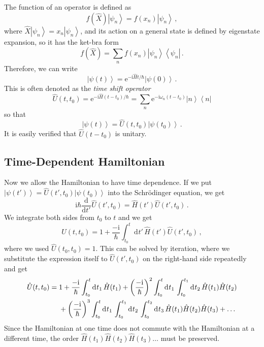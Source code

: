 \documentclass{article}
\theoremstyle{plain}\theoremheaderfont{\normalfont\itshape}\theorembodyfont{\rmfamily}\theoremseparator{.}\newtheorem*{rem}{Remark}\newtheorem*{ex}{Example}\newtheorem*{proof}{Proof}\newtheorem*{altp}{Alternative proof}
\theoremstyle{plain}\theoremheaderfont{\normalfont\bfseries}\theorembodyfont{\rmfamily}\theoremseparator{.}\newtheorem{thm}{Theorem}[section]\newtheorem{lem}[thm]{Lemma}\newtheorem{prop}[thm]{Proposition}\newtheorem*{cor}{Corollary}\newtheorem{defn}[thm]{Definition}\newtheorem{clm}[thm]{Claim}\newtheorem{clminproof}{Claim}
\theoremstyle{break}\theoremheaderfont{\normalfont\itshape}\theorembodyfont{\rmfamily}\theoremseparator{.\medskip}\newtheorem*{proofskip}{Proof}\newtheorem*{exs}{Examples}\newtheorem*{rems}{Remarks}
\theoremstyle{break}\theoremheaderfont{\normalfont\bfseries}\theorembodyfont{\rmfamily}\theoremseparator{.\medskip}\newtheorem{lemskip}[thm]{Lemma}\newtheorem{defnskip}[thm]{Definition}\newtheorem{propskip}[thm]{Proposition}\newtheorem{thmskip}[thm]{Theorem}
\numberwithin{equation}{section}
\newcommand{\ii}{\mathrm{i}}
\newcommand{\ee}{\mathrm{e}}
\newcommand{\dd}[2][]{\mathrm{d}^{#1} #2\,}
\newcommand{\dv}[3][]{\frac{\mathrm{d}^{#1} #2}{{\mathrm{d} #3}^{#1}}}
\newcommand{\bra}[1]{\left\langle #1 \right|}
\newcommand{\ket}[1]{\left| #1 \right\rangle}
\begin{document}
    The function of an operator is defined as
    \begin{equation}
        f(\hat{X})\ket{\psi_n}=f(x_n)\ket{\psi_n}\,,
    \end{equation}
    where \(\hat{X}\ket{\psi_n}=x_n\ket{\psi_n}\), and its action on a general state is defined by eigenstate expansion, so it has the ket-bra form
    \begin{equation}
        f(\hat{X})=\sum_n f(x_n)\ket{\psi_n}\bra{\psi_n}\,.
    \end{equation}
    Therefore, we can write
    \begin{equation}
        \ket{\psi(t)}=\ee^{-\ii\hat{H}t/\hbar}\ket{\psi(0)}\,.
    \end{equation}
    This is often denoted as the \textit{time shift operator}
    \begin{equation}
        \hat{U}(t,t_0)=\ee^{-\ii\hat{H}(t-t_0)/\hbar}=\sum_n \ee^{-\ii\omega_n(t-t_0)}\ket{n}\bra{n}
    \end{equation}
    so that
    \begin{equation}
        \ket{\psi(t)}=\hat{U}(t,t_0)\ket{\psi(t_0)}\,.
    \end{equation}
    It is easily verified that \(\hat{U}(t-t_0)\) is unitary.

    \subsection{Time-Dependent Hamiltonian}
    Now we allow the Hamiltonian to have time dependence. If we put \(\ket{\psi(t')}=\hat{U}(t',t_0)\ket{\psi(t_0)}\) into the Schr\"{o}dinger equation, we get
    \begin{equation}
        \ii\hbar\dv{}{t'}\hat{U}(t',t_0)=\hat{H}(t')\hat{U}(t',t_0)\,.
    \end{equation}
    We integrate both sides from \(t_0\) to \(t\) and we get
    \begin{equation}
        \hat{U}(t,t_0)=1+\frac{-\ii}{\hbar}\int_{t_0}^{t}\dd{t'}\hat{H}(t')\hat{U}(t',t_0)\,,
    \end{equation}
    where we used \(\hat{U}(t_0,t_0)=1\). This can be solved by iteration, where we substitute the expression itself to \(\hat{U}(t',t_0)\) on the right-hand side repeatedly and get
    \begin{align}\label{propagator_expansion}
        \hat{U}(t,t_0)&=1+\frac{-\ii}{\hbar}\int_{t_0}^{t}\dd{t_1}\hat{H}(t_1)+\left(\frac{-\ii}{\hbar}\right)^2\int_{t_0}^{t}\dd{t_1}\int_{t_0}^{t_1}\dd{t_2}\hat{H}(t_1)\hat{H}(t_2)\notag \\
        &\quad\ +\left(\frac{-\ii}{\hbar}\right)^3\int_{t_0}^{t}\dd{t_1}\int_{t_0}^{t_1}\dd{t_2}\int_{t_0}^{t_2}\dd{t_3}\hat{H}(t_1)\hat{H}(t_2)\hat{H}(t_3)+\dots
    \end{align}
    Since the Hamiltonian at one time does not commute with the Hamiltonian at a different time, the order \(\hat{H}(t_1)\hat{H}(t_2)\hat{H}(t_3)\dots\) must be preserved.
\end{document}
